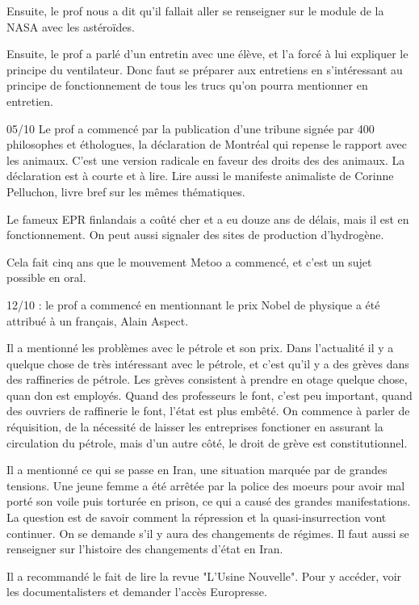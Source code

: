 \documentclass[a4paper,12pt]{book}
\begin{document}
\par Ensuite, le prof nous a dit qu'il fallait aller se renseigner sur le module de la NASA avec les astéroïdes.
\par Ensuite, le prof a parlé d'un entretin avec une élève, et l'a forcé à lui expliquer le principe du ventilateur. Donc faut se préparer aux entretiens en s'intéressant au principe de fonctionnement de tous les trucs qu'on pourra mentionner en entretien.
\par 05/10 Le prof a commencé par la publication d'une tribune signée par 400 philosophes et éthologues, la déclaration de Montréal qui repense le rapport avec les animaux. C'est une version radicale en faveur des droits des des animaux. La déclaration est à courte et à lire. Lire aussi le manifeste animaliste de Corinne Pelluchon, livre bref sur les mêmes thématiques.
\par Le fameux EPR finlandais a coûté cher et a eu douze ans de délais, mais il est en fonctionnement. On peut aussi signaler des sites de production d'hydrogène.
\par Cela fait cinq ans que le mouvement Metoo a commencé, et c'est un sujet possible en oral.
\par 12/10 : le prof a commencé en mentionnant le prix Nobel de physique a été attribué à un français, Alain Aspect.
\par Il a mentionné les problèmes avec le pétrole et son prix. Dans l'actualité il y a quelque chose de très intéressant avec le pétrole, et c'est qu'il y a des grèves dans des raffineries de pétrole. Les grèves consistent à prendre en otage quelque chose, quan don est employés. Quand des professeurs le font, c'est peu important, quand des ouvriers de raffinerie le font, l'état est plus embêté. On commence à parler de réquisition, de la nécessité de laisser les entreprises fonctioner en assurant la circulation du pétrole, mais d'un autre côté, le droit de grève est constitutionnel.
\par Il a mentionné ce qui se passe en Iran, une situation marquée par de grandes tensions. Une jeune femme a été arrêtée par la police des moeurs pour avoir mal porté son voile puis torturée en prison, ce qui a causé des grandes manifestations. La question est de savoir comment la répression et la quasi-insurrection vont continuer. On se demande s'il y aura des changements de régimes. Il faut aussi se renseigner sur l'histoire des changements d'état en Iran.
\par Il a recommandé le fait de lire la revue "L'Usine Nouvelle". Pour y accéder, voir les documentalisters et demander l'accès Europresse.
\end{document}
